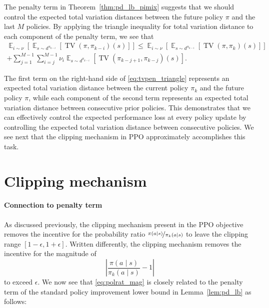 \documentclass{article}
\begin{document}
The penalty term in Theorem~\ref{thm:pd_lb_pimix} suggests that we should control the expected total variation distances between the future policy $\pi$ and the last $M$ policies. By applying the triangle inequality for total variation distance to each component of the penalty term, we see that 
\begin{multline}\label{eq:tvpen_triangle}
\mathop{\mathbb{E}}_{i \sim \nu} \left[ \mathop{\mathbb{E}}_{s \sim d^{\pi_{k-i}}} \left[ \operatorname{TV}(\pi,\pi_{k-i})(s) \right] \right] \leq \mathop{\mathbb{E}}_{i \sim \nu} \left[ \mathop{\mathbb{E}}_{s \sim d^{\pi_{k-i}}} \left[ \operatorname{TV}(\pi,\pi_{k})(s) \right] \right] \\ + \sum_{j=1}^{M-1} \sum_{i=j}^{M-1} \nu_i \mathop{\mathbb{E}}_{s \sim d^{\pi_{k-i}}} \left[ \operatorname{TV}(\pi_{k-j+1},\pi_{k-j})(s) \right].
\end{multline}

The first term on the right-hand side of \eqref{eq:tvpen_triangle} represents an expected total variation distance between the current policy $\pi_k$ and the future policy $\pi$, while each component of the second term represents an expected total variation distance between consecutive prior policies. This demonstrates that we can effectively control the expected performance loss at every policy update by controlling the expected total variation distance between consecutive policies. We see next that the clipping mechanism in PPO approximately accomplishes this task.


\section{Clipping mechanism}

\paragraph{Connection to penalty term}

As discussed previously, the clipping mechanism present in the PPO objective removes the incentive for the probability ratio $\nicefrac{\pi(a \mid s)}{\pi_k(a \mid s)}$ to leave the clipping range $[1-\epsilon,1+\epsilon]$. Written differently, the clipping mechanism removes the incentive for the magnitude of
\begin{equation}\label{eq:polrat_mag}
\left| \frac{\pi(a \mid s)}{\pi_k(a \mid s)} - 1  \right|
\end{equation}
to exceed $\epsilon$. We now see that \eqref{eq:polrat_mag} is closely related to the penalty term of the standard policy improvement lower bound in Lemma~\ref{lem:pd_lb} as follows:
\end{document}
